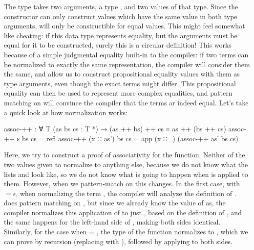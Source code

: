 		The type  takes two arguments, a type , and two
		values of that type. Since the constructor can only construct values
		which have the same value in both type arguments,  will
		only be constructible for equal values. This might feel somewhat like
		cheating: if this data type represents equality, but the arguments must
		be equal for it to be constructed, surely this is a circular
		definition! This works because of a simple judgmental equality built-in
		to the compiler: if two terms can be normalized to exactly the same
		representation, the compiler will consider them the same, and allow us
		to construct propositional equality values with them as type arguments,
		even though the exact terms might differ. This propositional equality
		can then be used to represent more complex equalities, and pattern
		matching on  will convince the compiler that the terms ar
		indeed equal. Let's take a quick look at how normalization works:

		\begin{code}
			assoc-++ : ∀ {T} (as bs cs : T *) → (as ++ bs) ++ cs ≡ as ++ (bs ++ cs)
			assoc-++ ε bs cs = refl
			assoc-++ (x ∷ as') bs cs = app (x ∷_) (assoc-++ as' bs cs)
		\end{code}

	 	Here, we try to construct a proof of associativity for the
	 	\codett{\_++\_} function. Neither of the two values given to
	 	 normalize to anything else, because we do not know what
	 	the lists  and  look like, so we do not know
	 	what is going to happen when \codett{\_++\_} is applied to them.
	 	However, when we pattern-match on  this changes. In the
	 	first case, with  $=\epsilon$, when normalizing the term
	 	, the compiler will analyze the definition of
	 	\codett{\_++\_}. \codett{\_++\_} does pattern matching on ,
	 	but since we already know the value of as, the compiler normalizes this
	 	application of \codett{\_++\_} to just , based on the
	 	definition of \codett{\_++\_}, and the same happens for the left-hand
	 	side of , making both sides identical.  Similarly, for
	 	the case when  = , the type of the function
	 	normalizes to , which we can prove by recursion (replacing  with
	 	), followed by applying  to both sides.
